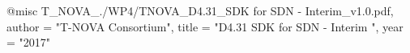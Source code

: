 @misc{ T_NOVA_./WP4/TNOVA_D4.31_SDK for SDN - Interim_v1.0.pdf,
       author = "T-NOVA Consortium",
       title = "D4.31 SDK for SDN - Interim ",
       year = "2017" }

